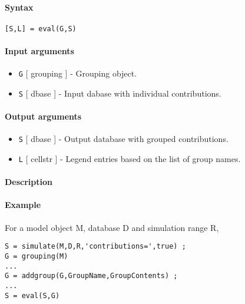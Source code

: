 


	\paragraph{Syntax}

\begin{verbatim}
[S,L] = eval(G,S)
\end{verbatim}

\paragraph{Input arguments}

\begin{itemize}
\item
  \texttt{G} {[} grouping {]} - Grouping object.
\item
  \texttt{S} {[} dbase {]} - Input dabase with individual contributions.
\end{itemize}

\paragraph{Output arguments}

\begin{itemize}
\item
  \texttt{S} {[} dbase {]} - Output database with grouped contributions.
\item
  \texttt{L} {[} cellstr {]} - Legend entries based on the list of group
  names.
\end{itemize}

\paragraph{Description}

\paragraph{Example}

For a model object M, database D and simulation range R,

\begin{verbatim}
S = simulate(M,D,R,'contributions=',true) ;
G = grouping(M)
...
G = addgroup(G,GroupName,GroupContents) ;
...
S = eval(S,G)
\end{verbatim}


